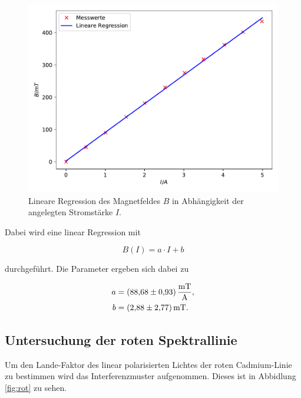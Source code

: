 \begin{figure}
    \centering
    \includegraphics[scale=0.7]{content/plot1.pdf}
    \vspace{-10pt}
    \caption{Lineare Regression des Magnetfeldes $B$ in Abhängigkeit der angelegten Stromstärke $I$.}
    \label{fig:plot1}
\end{figure}

Dabei wird eine linear Regression mit 

\begin{equation*}
    B(I) = a\cdot I + b
\end{equation*}

durchgeführt. Die Parameter ergeben sich dabei zu 

\begin{align*}
    a &= \SI{88.68+-0.93}{\milli\tesla\per\ampere}, \\
    b &= \SI{2.88+-2.77}{\milli\tesla}.
\end{align*}

\subsection{Untersuchung der roten Spektrallinie}

Um den Lande-Faktor des linear polarisierten Lichtes der roten Cadmium-Linie zu bestimmen wird das Interferenzmuster aufgenommen. Dieses
ist in Abbidlung \ref{fig:rot} zu sehen. 

